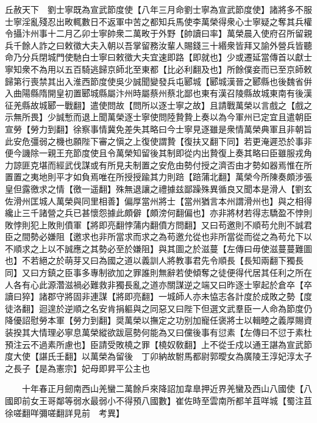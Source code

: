 丘赦天下　劉士寧既為宣武節度使【八年三月命劉士寧為宣武節度使】諸將多不服士寧淫亂殘忍出畋輒數日不返軍中苦之都知兵馬使李萬榮得衆心士寧疑之奪其兵權令攝汴州事十二月乙卯士寧帥衆二萬畋于外野【帥讀曰率】萬榮晨入使府召所留親兵千餘人詐之曰敕徵大夫入朝以吾掌留務汝輩人賜錢三十緡衆皆拜又諭外營兵皆聽命乃分兵閉城門使馳白士寧曰敕徵大夫宜速即路【即就也】少或遷延當傳首以獻士寧知衆不為用以五百騎逃歸京師北至東都【比必利翻及也】所餘僕妾而已至京師敕歸第行喪禁其出入淮西節度使吳少誠聞變發兵屯郾城【郾城漢晉之郾縣也後魏省倂入曲陽縣隋開皇初置郾城縣屬汴州時屬蔡州蔡北鄙也東有漢召陵縣故城東南有後漢征羌縣故城郾一戰翻】遣使問故【問所以逐士寧之故】且請戰萬榮以言戲之【戲之示無所畏】少誠慙而退上聞萬榮逐士寧使問陸贄贄上奏以為今軍州已定宜且遣朝臣宣勞【勞力到翻】徐察事情冀免差失其略曰今士寧見逐雖是衆情萬榮典軍且非朝旨此安危彊弱之機也願陛下審之愼之上復使謂贄【復扶又翻下同】若更淹遲恐於事非便今譏除一親王充節度使且令萬榮知留後其制即從内出贄復上奏其略曰臣雖服戎角力諒匪克堪而經武伐謀或有所見夫制置之安危由勢付授之濟否由才勢如器焉惟在所置置之夷地則平才如負焉唯在所授授踰其力則踣【踣蒲北翻】萬榮今所陳奏頗涉張皇但露徼求之情【徼一遥翻】殊無退讓之禮據兹鄙躁殊異循良又聞本是滑人【劉玄佐滑州匡城人萬榮與同里相善】偏厚當州將士【當州猶言本州謂滑州也】與之相得纔止三千諸營之兵已甚懷怨據此頗僻【頗滂何翻偏也】亦非將材若得志驕盈不悖則敗悖則犯上敗則僨軍【將即亮翻悖蒲内翻僨方問翻】又曰苟邀則不順苟允則不誠君臣之間勢必嫌阻【邀求也非所當求而求之為苟邀允從也非所當從而從之為苟允下以不順求之上以不誠應之其勢必至於嫌阻】與其圖之於滋蔓【左傳曰毋使滋蔓蔓難圖也】不若絕之於萌芽又曰為國之道以義訓人將教事君先令順長【長知兩翻下獨長同】又曰方鎮之臣事多專制欲加之罪誰則無辭若使傾奪之徒便得代居其任利之所在人各有心此源濳滋禍必難救非獨長亂之道亦關謀逆之端又曰昨逐士寧起於倉卒【卒讀曰猝】諸郡守將固非連謀【將即亮翻】一城師人亦未恊志各計度於成敗之勢【度徒洛翻】迴遑於逆順之名安肯捐軀與之同惡又曰陛下但選文武羣臣一人命為節度仍降優詔慰勞本軍【勞力到翻】奨萬榮以撫定之功别加寵任褒將士以輯睦之義厚賜資装揆其大情理必寧息萬榮縱欲跋扈勢何能為又曰儻後事有愆素【左傳曰不愆于素杜預注云不過素所慮也】臣請受敗橈之罪【橈奴敎翻】上不從壬戍以通王諶為宣武節度大使【諶氏壬翻】以萬榮為留後　丁卯納故駙馬都尉郭曖女為廣陵王淳妃淳太子之長子【是為憲宗】妃母即昇平公主也

　　十年春正月劒南西山羌蠻二萬餘戶來降詔加韋臯押近界羌蠻及西山八國使【八國即前女王哥鄰等弱水最弱小不得預八國數】崔佐時至雲南所都羊苴咩城【蜀注苴徐嗟翻咩彌嗟翻詳見前　考異】

